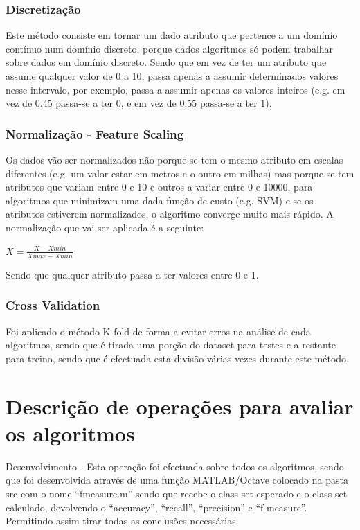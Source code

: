 \documentclass[portugues,final]{revdetua}
\begin{document}
\subsubsection{Discretização}

Este método consiste em tornar um dado atributo que pertence a um domínio contínuo num domínio discreto, porque dados algoritmos só podem trabalhar sobre dados em domínio discreto. Sendo que em vez de ter um atributo que assume qualquer valor de 0 a 10, passa apenas a assumir determinados valores nesse intervalo, por exemplo, passa a assumir apenas os valores inteiros (e.g. em vez de 0.45 passa-se a ter 0, e em vez de 0.55 passa-se a ter 1).

\subsubsection{Normalização - Feature Scaling}

Os dados vão ser normalizados não porque se tem o mesmo atributo em escalas diferentes (e.g. um valor estar em metros e o outro em milhas) mas porque se tem atributos que variam entre 0 e 10 e outros a variar entre 0 e 10000, para algoritmos que minimizam uma dada função de custo (e.g. SVM) e se os atributos estiverem normalizados, o algoritmo converge muito mais rápido.
A normalização que vai ser aplicada é a seguinte: 
\begin{center}{${X} = \frac{X - Xmin}{Xmax - Xmin}$}
\end{center}

Sendo que qualquer atributo passa a ter valores entre 0 e 1.

\subsubsection{Cross Validation}

Foi aplicado o método K-fold de forma a evitar erros na análise de cada algoritmos, sendo que é tirada uma porção do dataset para testes e a restante para treino, sendo que é efectuada esta divisão várias vezes durante este método.

\section{Descrição de operações para avaliar os algoritmos}

Desenvolvimento - Esta operação foi efectuada sobre todos os algoritmos, sendo que foi desenvolvida através de uma função MATLAB/Octave colocado na pasta src com o nome “fmeasure.m” sendo que recebe o class set esperado e o class set calculado, devolvendo o “accuracy”, “recall”, “precision” e “f-measure”. Permitindo assim tirar todas as conclusões necessárias.\\
\end{document}
